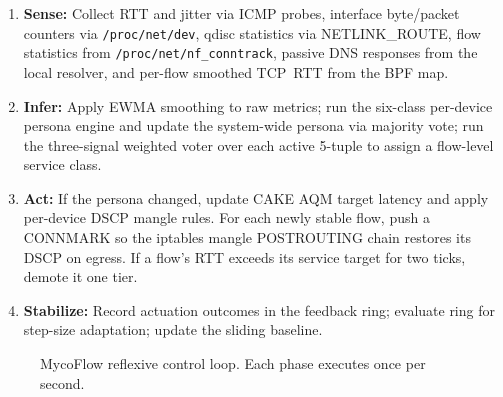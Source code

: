 \begin{enumerate}
  \item \textbf{Sense:} Collect RTT and jitter via ICMP probes, interface byte/packet counters via \texttt{/proc/net/dev}, qdisc statistics via NETLINK\_ROUTE, flow statistics from \texttt{/proc/net/nf\_conntrack}, passive DNS responses from the local resolver, and per-flow smoothed TCP~RTT from the BPF map.
  \item \textbf{Infer:} Apply EWMA smoothing to raw metrics; run the six-class per-device persona engine and update the system-wide persona via majority vote; run the three-signal weighted voter over each active 5-tuple to assign a flow-level service class.
  \item \textbf{Act:} If the persona changed, update CAKE AQM target latency and apply per-device DSCP mangle rules. For each newly stable flow, push a CONNMARK so the iptables mangle POSTROUTING chain restores its DSCP on egress. If a flow's RTT exceeds its service target for two ticks, demote it one tier.
  \item \textbf{Stabilize:} Record actuation outcomes in the feedback ring; evaluate ring for step-size adaptation; update the sliding baseline.
\end{enumerate}

\begin{figure}[h]
\centering
{}
\caption{MycoFlow reflexive control loop. Each phase executes once per second.}
\label{fig:arch}
\end{figure}

